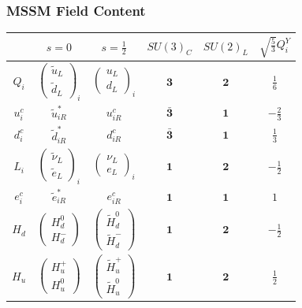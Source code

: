 \documentclass[10pt,aspectratio=169]{beamer}
\begin{document}
\begin{frame}
  \frametitle{MSSM Field Content}
  \begin{table}[h]
    \centering
    \small
    \begin{tabular}{cccccc}
      \toprule
      & $s = 0$ & $s = \frac{1}{2}$ & $SU(3)_C$ & $SU(2)_L$
      & $\sqrt{\frac{5}{3}} Q_i^Y$ \\
      \midrule
      $Q_i$ & $\begin{pmatrix} \tilde{u}_{L} \\
        \tilde{d}_{L} \end{pmatrix}_i$
      & $\begin{pmatrix} u_{L} \\ d_L\end{pmatrix}_i$
        & $\mathbf{3}$ & $\mathbf{2}$ & $\frac{1}{6}$ \\[1em]
        $u^c_i$ & $\tilde{u}^*_{iR}$ & $u^c_{iR}$
        & $\bar{\mathbf{3}}$ & $\mathbf{1}$ & $-\frac{2}{3}$ \\[0.5em]
        $d^c_i$ & $\tilde{d}^*_{iR}$ & $d^c_{iR}$
        & $\bar{\mathbf{3}}$ & $\mathbf{1}$ & $\frac{1}{3}$ \\[0.5em]
        $L_i$ & $\begin{pmatrix} \tilde{\nu}_{L} \\
          \tilde{e}_{L} \end{pmatrix}_i$
        & $\begin{pmatrix} \nu_{L}\\ e_L \end{pmatrix}_i$
        & $\mathbf{1}$ & $\mathbf{2}$ & $-\frac{1}{2}$ \\[1em]
        $e^c_i$ & $\tilde{e}^*_{iR}$ & $e^c_{iR}$
        & $\mathbf{1}$ & $\mathbf{1}$ & $1$ \\[0.5em]
        $H_d$ & $\begin{pmatrix} H_d^0 \\ H_d^- \end{pmatrix}$
        & $\begin{pmatrix} \tilde{H}_d^0 \\ \tilde{H}_d^- \end{pmatrix}$
        & $\mathbf{1}$ & $\mathbf{2}$ & $-\frac{1}{2}$ \\[1em]
        $H_u$ & $\begin{pmatrix} H_u^+ \\ H_u^0 \end{pmatrix}$
        & $\begin{pmatrix} \tilde{H}_u^+ \\ \tilde{H}_u^0 \end{pmatrix}$
        & $\mathbf{1}$ & $\mathbf{2}$ & $\frac{1}{2}$ \\[1em]
        \bottomrule
    \end{tabular}
  \end{table}
\end{frame}
\end{document}
